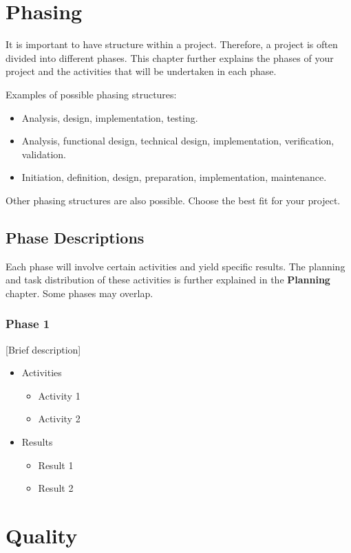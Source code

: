 \documentclass{article}
\begin{document}
\newpage
\section{Phasing}
It is important to have structure within a project. Therefore, a project is often divided into different phases. This chapter further explains the phases of your project and the activities that will be undertaken in each phase.

Examples of possible phasing structures:
\begin{itemize}
    \item Analysis, design, implementation, testing.
    \item Analysis, functional design, technical design, implementation, verification, validation.
    \item Initiation, definition, design, preparation, implementation, maintenance.
\end{itemize}
Other phasing structures are also possible. Choose the best fit for your project.

\subsection{Phase Descriptions}
Each phase will involve certain activities and yield specific results. The planning and task distribution of these activities is further explained in the \textbf{Planning} chapter. Some phases may overlap.

\subsubsection{Phase 1}
[Brief description]
\begin{itemize}
    \item Activities
    \begin{itemize}
        \item Activity 1
        \item Activity 2
    \end{itemize}
    \item Results
    \begin{itemize}
        \item Result 1
        \item Result 2
    \end{itemize}
\end{itemize}


\newpage
\section{Quality}
\end{document}
